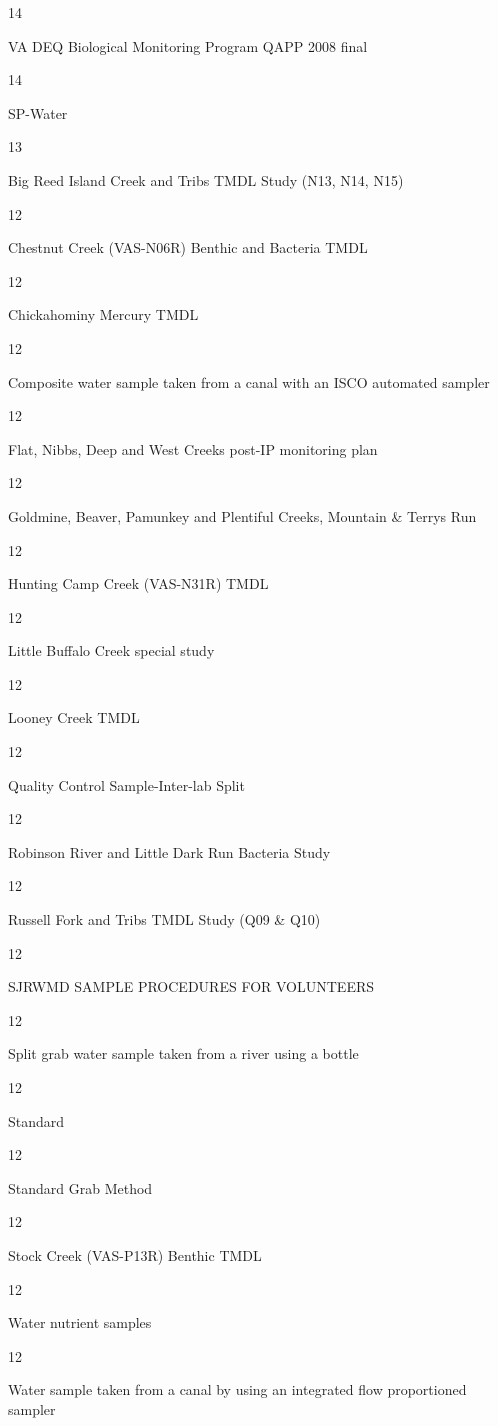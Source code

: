 \documentclass[]{article}
\begin{document}
14

VA DEQ Biological Monitoring Program QAPP 2008 final

14

SP-Water

13

Big Reed Island Creek and Tribs TMDL Study (N13, N14, N15)

12

Chestnut Creek (VAS-N06R) Benthic and Bacteria TMDL

12

Chickahominy Mercury TMDL

12

Composite water sample taken from a canal with an ISCO automated sampler

12

Flat, Nibbs, Deep and West Creeks post-IP monitoring plan

12

Goldmine, Beaver, Pamunkey and Plentiful Creeks, Mountain \& Terrys Run

12

Hunting Camp Creek (VAS-N31R) TMDL

12

Little Buffalo Creek special study

12

Looney Creek TMDL

12

Quality Control Sample-Inter-lab Split

12

Robinson River and Little Dark Run Bacteria Study

12

Russell Fork and Tribs TMDL Study (Q09 \& Q10)

12

SJRWMD SAMPLE PROCEDURES FOR VOLUNTEERS

12

Split grab water sample taken from a river using a bottle

12

Standard

12

Standard Grab Method

12

Stock Creek (VAS-P13R) Benthic TMDL

12

Water nutrient samples

12

Water sample taken from a canal by using an integrated flow proportioned
sampler
\end{document}
